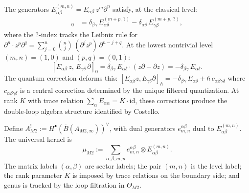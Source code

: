 \begin{example}
\label{ex:m2-commutation-explicit}
The generators $E^{(m,n)}_{\alpha\beta} = E_{\alpha\beta}\,z^m
\partial^n$ satisfy, at the classical level:
\begin{align}
[E^{(m,n)}_{\alpha\beta},\, E^{(p,q)}_{\gamma\delta}]_0
&= \delta_{\beta\gamma}\,E^{(m{+}p,\,?)}_{\alpha\delta}
- \delta_{\alpha\delta}\,E^{(m{+}p,\,?)}_{\gamma\beta},
\end{align}
where the $?$-index tracks the Leibniz rule for $\partial^n \cdot
z^p\partial^q = \sum_{j=0}^n \binom{n}{j}\,
(\partial^j z^p)\,\partial^{n-j+q}$. At the lowest nontrivial
level $(m,n) = (1,0)$ and $(p,q) = (0,1)$:
\[
[E_{\alpha\beta}\,z,\, E_{\gamma\delta}\,\partial]_0
= \delta_{\beta\gamma}\,E_{\alpha\delta}
\cdot (z\partial - \partial z)
= -\delta_{\beta\gamma}\,E_{\alpha\delta}.
\]
The quantum correction deforms this: $[E_{\alpha\beta}z,
E_{\gamma\delta}\partial]_\hbar
= -\delta_{\beta\gamma}\,E_{\alpha\delta}
+ \hbar\,c_{\alpha\beta\gamma\delta}$ where
$c_{\alpha\beta\gamma\delta}$ is a central correction determined
by the unique filtered quantization. At rank $K$ with trace
relation $\sum_\alpha E_{\alpha\alpha} = K\cdot\mathrm{id}$, these
corrections produce the double-loop algebra structure identified
by Costello.
\end{example}

\begin{definition}
\label{def:m2-koszul-dual}
Define
$A^!_{M2} := H^\bullet(\overline{B}(A_{M2,\infty}))^{\vee}$,
with dual generators $e^{\alpha\beta}_{m,n}$ dual to
$E^{(m,n)}_{\alpha\beta}$. The universal kernel is
\begin{equation}
\label{eq:m2-universal-kernel}
\mu_{M2}
:=
\sum_{\alpha,\beta,m,n}
e^{\alpha\beta}_{m,n} \otimes E^{(m,n)}_{\alpha\beta}.
\end{equation}
The matrix labels $(\alpha,\beta)$ are sector labels; the pair
$(m,n)$ is the level label; the rank parameter $K$ is imposed by
trace relations on the boundary side; and genus is tracked by the
loop filtration in $\Theta_{M2}$.
\end{definition}

